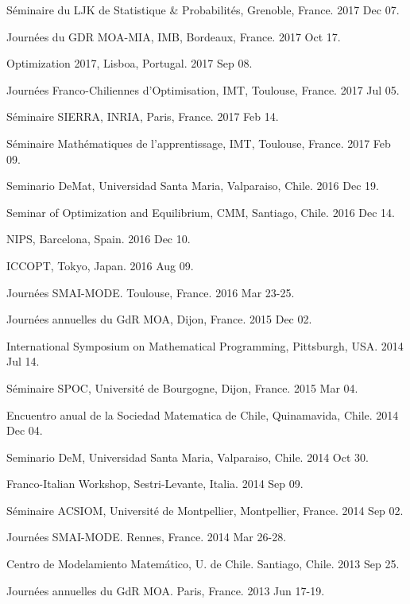 \documentclass[11pt,a4paper,sans]{moderncv}        %
\begin{document}
{\begin{small}
\begin{cvitemize}
	\item Séminaire du LJK de Statistique \& Probabilités, Grenoble, France. 2017 Dec 07.
	\item Journées du GDR MOA-MIA, IMB, Bordeaux, France. 2017 Oct 17.
	\item Optimization 2017, Lisboa, Portugal. 2017 Sep 08.
	\item Journées Franco-Chiliennes d'Optimisation, IMT, Toulouse, France. 2017 Jul 05.
	\item Séminaire SIERRA, INRIA, Paris, France. 2017 Feb 14.
	\item Séminaire Mathématiques de l'apprentissage, IMT, Toulouse, France. 2017 Feb 09.
	\item Seminario  DeMat, Universidad Santa Maria, Valparaiso, Chile. 2016 Dec 19.
	\item Seminar of Optimization and Equilibrium, CMM, Santiago, Chile. 2016 Dec 14.
	\item NIPS, Barcelona, Spain. 2016 Dec 10.
	\item ICCOPT, Tokyo, Japan. 2016 Aug 09.
	\item Journées SMAI-MODE. Toulouse, France. 2016 Mar 23-25.
	\item Journées annuelles du GdR MOA, Dijon, France. 2015 Dec 02.
	\item International Symposium on Mathematical Programming, Pittsburgh, USA. 2014 Jul 14.
	\item Séminaire SPOC, Université de Bourgogne, Dijon, France. 2015 Mar 04.
	\item Encuentro anual de la Sociedad Matematica de Chile, Quinamavida, Chile. 2014 Dec 04.
	\item Seminario DeM, Universidad Santa Maria, Valparaiso, Chile. 2014 Oct 30.
	\item Franco-Italian Workshop, Sestri-Levante, Italia. 2014 Sep 09.
	\item Séminaire ACSIOM, Université de Montpellier, Montpellier, France. 2014 Sep 02.
	\item Journées SMAI-MODE. Rennes, France. 2014 Mar 26-28.
	\item Centro de Modelamiento Matemático, U. de Chile. Santiago, Chile. 2013 Sep 25.
	\item Journées annuelles du GdR  MOA. Paris, France. 2013 Jun 17-19.
\end{cvitemize}
\end{small}
}
\end{document}
